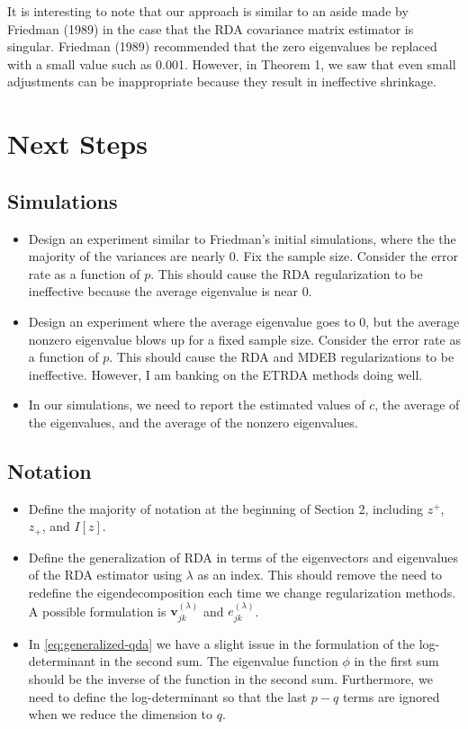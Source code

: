 \documentclass[11pt]{article}
\begin{document}
It is interesting to note that our approach is similar to an aside made by Friedman (1989) in the case that the RDA covariance matrix estimator is singular. Friedman (1989) recommended that the zero eigenvalues be replaced with a small value such as 0.001. However, in Theorem 1, we saw that even small adjustments can be inappropriate because they result in ineffective shrinkage.

\section{Next Steps}

\subsection{Simulations}

\begin{itemize}
	\item  Design an experiment similar to Friedman's initial simulations, where the the majority of the variances are nearly 0. Fix the sample size. Consider the error rate as a function of $p$. This should cause the RDA regularization to be ineffective because the average eigenvalue is near 0.
	
	\item  Design an experiment where the average eigenvalue goes to 0, but the average nonzero eigenvalue blows up for a fixed sample size. Consider the error rate as a function of $p$. This should cause the RDA and MDEB regularizations to be ineffective. However, I am banking on the ETRDA methods doing well.
	
	\item In our simulations, we need to report the estimated values of $c$, the average of the eigenvalues, and the average of the nonzero eigenvalues.

\end{itemize}

\subsection{Notation}

\begin{itemize}
	\item Define the majority of notation at the beginning of Section 2, including $z^+$, $z_+$, and $I[z]$.
	\item Define the generalization of RDA in terms of the eigenvectors and eigenvalues of the RDA estimator using $\lambda$ as an index. This should remove the need to redefine the eigendecomposition each time we change regularization methods. A possible formulation is $\bm v_{jk}^{(\lambda)}$ and $e_{jk}^{(\lambda)}$.
	\item In \eqref{eq:generalized-qda} we have a slight issue in the formulation of the log-determinant in the second sum. The eigenvalue function $\phi$ in the first sum should be the inverse of the function in the second sum. Furthermore, we need to define the log-determinant so that the last $p - q$ terms are ignored when we reduce the dimension to $q$.
\end{itemize}
\end{document}
